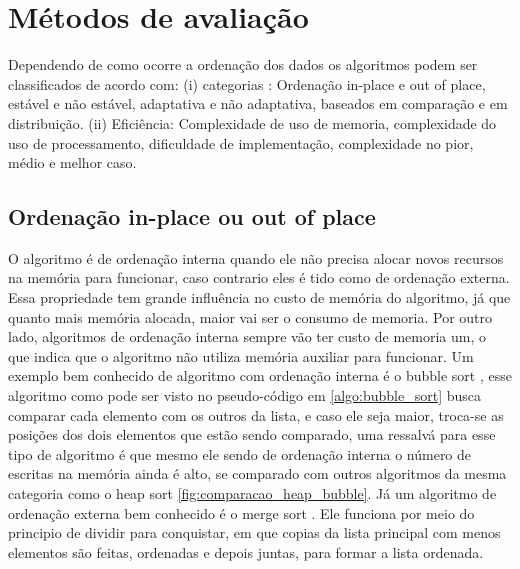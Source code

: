 \documentclass[12pt]{article}
\begin{document}
\section{Métodos de avaliação}
\label{sec:met_ava}

Dependendo de como ocorre a ordenação dos dados os algoritmos podem ser classificados de acordo com: (i) categorias \cite{prajapatiperformance}: Ordenação in-place e out of place, estável e não estável, adaptativa e não adaptativa, baseados em comparação e em distribuição. (ii) Eficiência: Complexidade de uso de memoria, complexidade do uso de processamento, dificuldade de implementação, complexidade no pior, médio e melhor caso.


\subsection{Ordenação in-place ou out of place}
O algoritmo é de ordenação interna quando ele não precisa alocar novos recursos na memória para funcionar, caso contrario eles é tido como de ordenação externa. Essa propriedade tem grande influência no custo de memória do algoritmo, já que quanto mais memória alocada, maior vai ser o consumo de memoria. Por outro lado, algoritmos de ordenação interna sempre vão ter custo de memoria um, o que indica que o algoritmo não utiliza memória auxiliar para funcionar. Um exemplo bem conhecido de algoritmo com ordenação interna é o bubble sort \cite{astrachan2003bubble}, esse algoritmo como pode ser visto no pseudo-código em \ref{algo:bubble_sort} busca comparar cada elemento com os outros da lista, e caso ele seja maior, troca-se as posições dos dois elementos que estão sendo comparado, uma ressalvá para esse tipo de algoritmo é que mesmo ele sendo de ordenação interna o número de escritas na memória ainda é alto, se comparado com outros algoritmos da mesma categoria como o heap sort \ref{fig:comparacao_heap_bubble}. Já um algoritmo de ordenação externa bem conhecido é o merge sort \cite{cole1988parallel}. Ele funciona por meio do principio de dividir para conquistar, em que copias da lista principal com menos elementos são feitas, ordenadas e depois juntas, para formar a lista ordenada.
\end{document}

